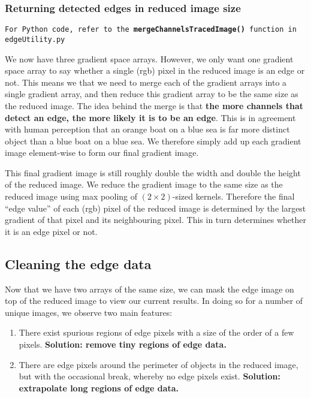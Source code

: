 \documentclass[11pt]{article}
\begin{document}
\subsubsection{Returning detected edges in reduced image size}
\begin{center}
\texttt{For Python code, refer to the {\bf mergeChannelsTracedImage()} function in edgeUtility.py}
\end{center}
We now have three gradient space arrays. However, we only want one gradient space array to say whether a single (rgb) pixel in the reduced image is an edge or not. This means we that we need to merge each of the gradient arrays into a single gradient array, and then reduce this gradient array to be the same size as the reduced image. The idea behind the merge is that \textbf{the more channels that detect an edge, the more likely it is to be an edge}. This is in agreement with human perception that an orange boat on a blue sea is far more distinct object than a blue boat on a blue sea. We therefore simply add up each gradient image element-wise to form our final gradient image.

This final gradient image is still roughly double the width and double the height of the reduced image. We reduce the gradient image to the same size as the reduced image using max pooling of $(2 \times 2)$-sized kernels. Therefore the final ``edge value'' of each (rgb) pixel of the reduced image is determined by the largest gradient of that pixel and its neighbouring pixel. This in turn determines whether it is an edge pixel or not.

\subsection{Cleaning the edge data}
Now that we have two arrays of the same size, we can mask the edge image on top of the reduced image to view our current results. In doing so for a number of unique images, we observe  two main features:
\begin{enumerate}
  \item There exist spurious regions of edge pixels with a size of the order of a few pixels. \textbf{Solution: remove tiny regions of edge data.}
  \item There are edge pixels around the perimeter of objects in the reduced image, but with the occasional break, whereby no edge pixels exist. \textbf{Solution: extrapolate long regions of edge data.}
\end{enumerate}
\end{document}
